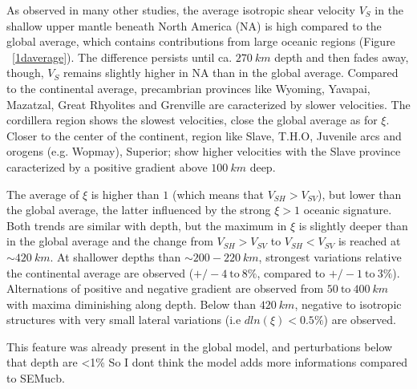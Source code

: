 \documentclass[12pt]{article}
\begin{document}
		As observed in many other studies, the average isotropic shear velocity $V_S$ in the shallow upper mantle beneath North America (NA) is high compared to the global average, which contains contributions from large oceanic regions (Figure ~\ref{1daverage}). 
		The difference persists until ca. $270 \: km$ depth and then fades away, though, $V_S$ remains slightly higher in NA than in the global average. 
		Compared to the continental average, precambrian provinces like Wyoming, Yavapai, Mazatzal, Great Rhyolites and Grenville are caracterized by slower velocities. 
		The cordillera region shows the slowest velocities, close the global average as for $\xi$. 
		Closer to the center of the continent, region like Slave, T.H.O, Juvenile arcs and orogens (e.g. Wopmay), Superior; show higher velocities with the Slave province caracterized by a positive gradient above $100 \: km$ deep.


		The average of $\xi$ is higher than $1$ (which means that $V_{SH} > V_{SV}$), but lower than the global average, the latter influenced by the strong $\xi > 1$ oceanic signature. 
		Both trends are similar with depth, but the maximum in $\xi$ is slightly deeper than in the global average and the change from $V_{SH} > V_{SV}$ to $V_{SH} < V_{SV}$ is reached at $\sim 420 \: km$. 
		At shallower depths than $\sim 200 - 220 \: km$, strongest variations relative the continental average are observed ($+/- 4 \: \text{to} \: 8 \%$, compared to $+/- 1 \: \text{to} \: 3 \%$). 
		Alternations of positive and negative gradient are observed from $50 \: \text{to} \: 400 \: km$ with maxima diminishing along depth. Below than $420 \: km$, negative to isotropic structures with very small lateral variations (i.e $ dln(\xi) < 0.5 \%$) are observed.

		

		{\color{red} This feature was already present in the global model, and perturbations below that depth are <1\% So I dont think the model adds more informations compared to SEMucb}.
\end{document}
